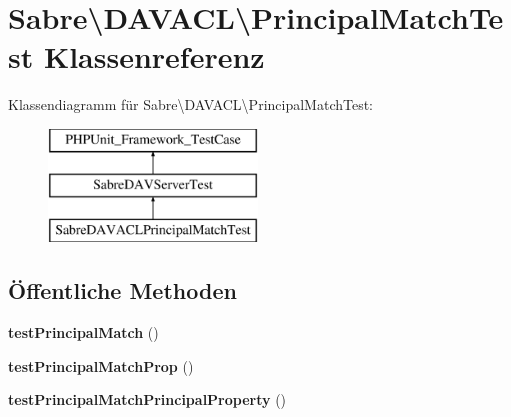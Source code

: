 \hypertarget{class_sabre_1_1_d_a_v_a_c_l_1_1_principal_match_test}{}\section{Sabre\textbackslash{}D\+A\+V\+A\+CL\textbackslash{}Principal\+Match\+Test Klassenreferenz}
\label{class_sabre_1_1_d_a_v_a_c_l_1_1_principal_match_test}
Klassendiagramm für Sabre\textbackslash{}D\+A\+V\+A\+CL\textbackslash{}Principal\+Match\+Test\+:\begin{figure}[H]
\begin{center}
\leavevmode
\includegraphics[height=3.000000cm]{class_sabre_1_1_d_a_v_a_c_l_1_1_principal_match_test}
\end{center}
\end{figure}
\subsection*{Öffentliche Methoden}
\begin{DoxyCompactItemize}
\item 
\mbox{\label{class_sabre_1_1_d_a_v_a_c_l_1_1_principal_match_test_af054a33e9ce0da80e46454ee15401ddc}} 
{\bfseries test\+Principal\+Match} ()
\item 
\mbox{\label{class_sabre_1_1_d_a_v_a_c_l_1_1_principal_match_test_a6211ec3b34899efdc905a0065323c898}} 
{\bfseries test\+Principal\+Match\+Prop} ()
\item 
\mbox{\label{class_sabre_1_1_d_a_v_a_c_l_1_1_principal_match_test_a7aaffa56b2212af9ac6f43d4b9079f7d}} 
{\bfseries test\+Principal\+Match\+Principal\+Property} ()
\end{DoxyCompactItemize}
